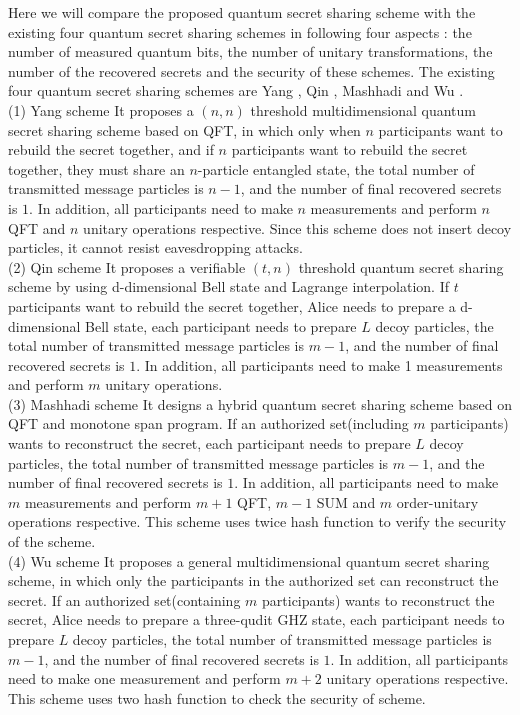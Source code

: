 \documentclass[pdflatex,sn-mathphys]{sn-jnl}%
\theoremstyle{thmstyleone}%
\theoremstyle{thmstyletwo}%
\theoremstyle{thmstylethree}%
\begin{document}
Here we will compare the proposed quantum secret sharing scheme with the existing four quantum secret sharing schemes in following four aspects : the number of measured quantum bits, the number of unitary transformations, the number of the recovered secrets and the security of these schemes. The existing four quantum secret sharing schemes are Yang \citep{ref-ur15}, Qin \citep{ref-ur16}, Mashhadi \citep{ref-ur20} and Wu \citep{ref-ur21}.\\
\indent(1) Yang \citep{ref-ur15} scheme   It proposes a $(n,n)$ threshold multidimensional quantum secret sharing scheme based on QFT, in which only when $n$ participants want to rebuild the secret together, and if $n$ participants want to rebuild the secret together, they must share an $n$-particle entangled state, the total number of transmitted message particles is $n-1$, and the number of final recovered secrets is $1$. In addition, all participants need to make $n$ measurements and perform $n$ QFT and $n$ unitary operations respective. Since this scheme does not insert decoy particles, it cannot resist eavesdropping attacks. \\
\indent(2) Qin \citep{ref-ur16} scheme   It proposes a verifiable $(t,n)$ threshold quantum secret sharing scheme by using d-dimensional Bell state and Lagrange interpolation. If $t$ participants want to rebuild the secret together, Alice needs to prepare a d-dimensional Bell state, each participant needs to prepare $L$ decoy particles, the total number of transmitted message particles is $m-1$, and the number of final recovered secrets is $1$. In addition, all participants need to make 1 measurements and perform $m$ unitary operations. \\
\indent(3) Mashhadi \citep{ref-ur20} scheme   It designs a hybrid quantum secret sharing scheme based on QFT and monotone span program. If an authorized set(including $m$ participants) wants to reconstruct the secret, each participant needs to prepare $L$ decoy particles, the total number of transmitted message particles is $m-1$, and the number of final recovered secrets is $1$. In addition, all participants need to make $m$ measurements and perform $m+1$ QFT, $m-1$ SUM and $m$ order-unitary operations respective. This scheme uses twice hash function to verify the security of the scheme.  \\
\indent(4) Wu \citep{ref-ur21} scheme   It proposes a general multidimensional quantum secret sharing scheme, in which only the participants in the authorized set can reconstruct the secret. If an authorized set(containing $m$ participants) wants to reconstruct the secret, Alice needs to prepare a three-qudit GHZ state, each participant needs to prepare $L$ decoy particles, the total number of transmitted message particles is $m-1$, and the number of final recovered secrets is $1$. In addition, all participants need to make one measurement and perform $m+2$ unitary operations respective. This scheme uses two hash function to check the security of scheme.  \\
\end{document}
